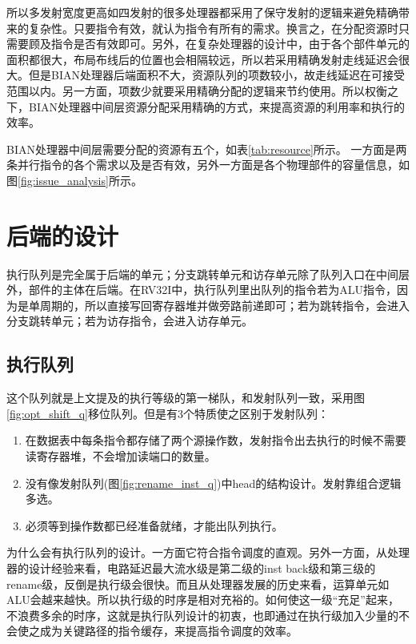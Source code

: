 所以多发射宽度更高如四发射的很多处理器都采用了保守发射的逻辑来避免精确带来的复杂性。只要指令有效，就认为指令有所有的需求。换言之，在分配资源时只需要顾及指令是否有效即可。另外，在复杂处理器的设计中，由于各个部件单元的面积都很大，布局布线后的位置也会相隔较远，所以若采用精确发射走线延迟会很大。但是BIAN处理器后端面积不大，资源队列的项数较小，故走线延迟在可接受范围以内。另一方面，项数少就要采用精确分配的逻辑来节约使用。所以权衡之下，BIAN处理器中间层资源分配采用精确的方式，来提高资源的利用率和执行的效率。


BIAN处理器中间层需要分配的资源有五个，如表\ref{tab:resource}所示。
一方面是两条并行指令的各个需求以及是否有效，另外一方面是各个物理部件的容量信息，如图\ref{fig:issue_analysis}所示。

\section{后端的设计}
执行队列是完全属于后端的单元；分支跳转单元和访存单元除了队列入口在中间层外，部件的主体在后端。在RV32I中，执行队列里出队列的指令若为ALU指令，因为是单周期的，所以直接写回寄存器堆并做旁路前递即可；若为跳转指令，会进入分支跳转单元；若为访存指令，会进入访存单元。

\subsection{执行队列}\label{subsec:execute_q}

这个队列就是上文提及的执行等级的第一梯队，和发射队列一致，采用图\ref{fig:opt_shift_q}移位队列。但是有3个特质使之区别于发射队列：
\begin{enumerate}[label=(\alph*)]
	\item 在数据表中每条指令都存储了两个源操作数，发射指令出去执行的时候不需要读寄存器堆，不会增加读端口的数量。
	\item 没有像发射队列(图\ref{fig:rename_inst_q})中head的结构设计。发射靠组合逻辑多选。
	\item 必须等到操作数都已经准备就绪，才能出队列执行。
\end{enumerate}

为什么会有执行队列的设计。一方面它符合指令调度的直观。另外一方面，从处理器的设计经验来看，电路延迟最大流水级是第二级的inst back级和第三级的rename级，反倒是执行级会很快。而且从处理器发展的历史来看，运算单元如ALU会越来越快。所以执行级的时序是相对充裕的。如何使这一级``充足''起来，不浪费多余的时序，这就是执行队列设计的初衷，也即通过在执行级加入少量的不会使之成为关键路径的指令缓存，来提高指令调度的效率。

